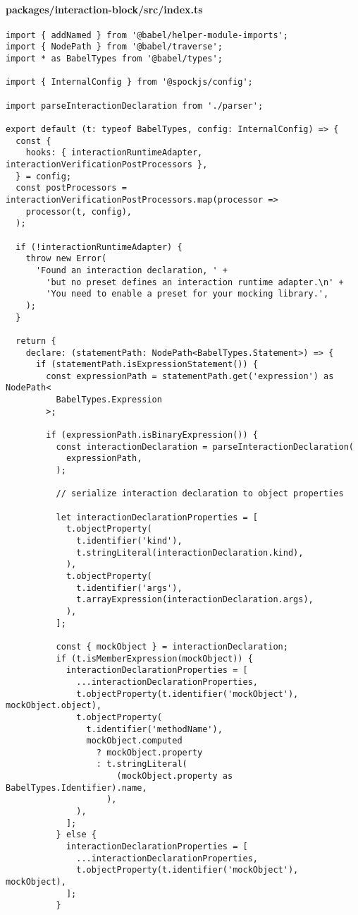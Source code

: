 \paragraph*{packages/interaction-block/src/index.ts}
\begin{verbatim}
import { addNamed } from '@babel/helper-module-imports';
import { NodePath } from '@babel/traverse';
import * as BabelTypes from '@babel/types';

import { InternalConfig } from '@spockjs/config';

import parseInteractionDeclaration from './parser';

export default (t: typeof BabelTypes, config: InternalConfig) => {
  const {
    hooks: { interactionRuntimeAdapter, interactionVerificationPostProcessors },
  } = config;
  const postProcessors = interactionVerificationPostProcessors.map(processor =>
    processor(t, config),
  );

  if (!interactionRuntimeAdapter) {
    throw new Error(
      'Found an interaction declaration, ' +
        'but no preset defines an interaction runtime adapter.\n' +
        'You need to enable a preset for your mocking library.',
    );
  }

  return {
    declare: (statementPath: NodePath<BabelTypes.Statement>) => {
      if (statementPath.isExpressionStatement()) {
        const expressionPath = statementPath.get('expression') as NodePath<
          BabelTypes.Expression
        >;

        if (expressionPath.isBinaryExpression()) {
          const interactionDeclaration = parseInteractionDeclaration(
            expressionPath,
          );

          // serialize interaction declaration to object properties

          let interactionDeclarationProperties = [
            t.objectProperty(
              t.identifier('kind'),
              t.stringLiteral(interactionDeclaration.kind),
            ),
            t.objectProperty(
              t.identifier('args'),
              t.arrayExpression(interactionDeclaration.args),
            ),
          ];

          const { mockObject } = interactionDeclaration;
          if (t.isMemberExpression(mockObject)) {
            interactionDeclarationProperties = [
              ...interactionDeclarationProperties,
              t.objectProperty(t.identifier('mockObject'), mockObject.object),
              t.objectProperty(
                t.identifier('methodName'),
                mockObject.computed
                  ? mockObject.property
                  : t.stringLiteral(
                      (mockObject.property as BabelTypes.Identifier).name,
                    ),
              ),
            ];
          } else {
            interactionDeclarationProperties = [
              ...interactionDeclarationProperties,
              t.objectProperty(t.identifier('mockObject'), mockObject),
            ];
          }


\end{verbatim}
